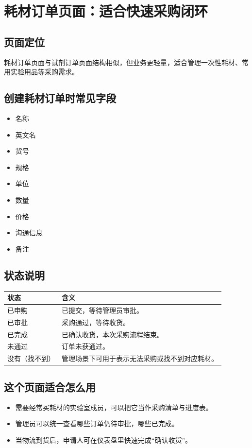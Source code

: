 \documentclass[12pt,a4paper]{ctexart}
\begin{document}
\newpage
\section{耗材订单页面：适合快速采购闭环}

\subsection{页面定位}
耗材订单页面与试剂订单页面结构相似，但业务更轻量，适合管理一次性耗材、常用实验用品等采购需求。

\subsection{创建耗材订单时常见字段}
\begin{itemize}
  \item 名称
  \item 英文名
  \item 货号
  \item 规格
  \item 单位
  \item 数量
  \item 价格
  \item 沟通信息
  \item 备注
\end{itemize}

\subsection{状态说明}
\begin{longtable}{p{3cm} p{10cm}}
\toprule
状态 & 含义 \\
\midrule
已申购 & 已提交，等待管理员审批。 \\
已审批 & 采购通过，等待收货。 \\
已完成 & 已确认收货，本次采购流程结束。 \\
未通过 & 订单未获通过。 \\
没有（找不到） & 管理场景下可用于表示无法采购或找不到对应耗材。 \\
\bottomrule
\end{longtable}

\subsection{这个页面适合怎么用}
\begin{itemize}
  \item 需要经常买耗材的实验室成员，可以把它当作采购清单与进度表。
  \item 管理员可以统一查看哪些订单仍待审批，哪些已完成。
  \item 当物流到货后，申请人可在仪表盘里快速完成“确认收货”。
\end{itemize}
\end{document}
